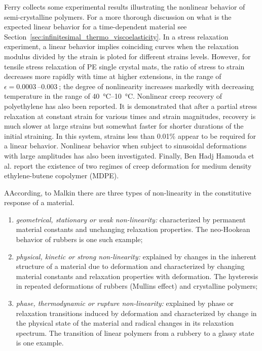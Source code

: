 Ferry \citep{ferryViscoelasticPropertiesPolymers1980} collects some experimental results illustrating the nonlinear behavior of semi-crystalline polymers.
For a more thorough discussion on what is the expected linear behavior for a time-dependent material see Section~\ref{sec:infinitesimal_thermo_viscoelasticity}.
In a stress relaxation experiment, a linear behavior implies coinciding curves when the relaxation modulus divided by the strain is ploted for different strains levels.
However, for tensile stress relaxation of PE single crystal mats, the ratio of stress to strain decreases more rapidly with time at higher extensions, in the range of $\epsilon = \SIrange{0.0003}{0.003}{}$; the degree of nonlinearity increases markedly with decreasing temperature in the range of \SIrange{40}{10}{\celsius}.
Nonlinear creep recovery of polyethylene has also been reported.
It is demonstrated that after a partial stress relaxation at constant strain for various times and strain magnitudes, recovery is much slower at large strains but somewhat faster for shorter durations of the initial straining.
In this system, strains less than 0.01\% appear to be required for a linear behavior.
Nonlinear behavior when subject to sinusoidal deformations with large amplitudes has also been investigated.
Finally, Ben Hadj Hamouda et al. \citep{benhadjhamoudaViscoplasticBehaviourMedium2007} report the existence of two regimes of creep deformation for medium density ethylene-butene copolymer (MDPE).

\begin{remark}
	AAccording, to Malkin \citep{malkinNonlinearityRheologyEssay1995} there are three types of non-linearity in the constitutive response of a material.
	\begin{enumerate}
		\item \textit{geometrical, stationary or weak non-linearity:} characterized by permanent material constants and unchanging relaxation properties. The neo-Hookean behavior of rubbers is one such example;
		\item \textit{physical, kinetic or strong non-linearity:} explained by changes in the inherent structure of a material due to deformation and characterized by changing material constants and relaxation properties with deformation. The hysteresis in repeated deformations of rubbers (Mullins effect) and crystalline polymers;
		\item \textit{phase, thermodynamic or rupture non-linearity:} explained by phase or relaxation transitions induced by deformation and characterized by change in the physical state of the material and radical changes in its relaxation spectrum. The transition of linear polymers from a rubbery to a glassy state is one example.
	\end{enumerate}
\end{remark}


